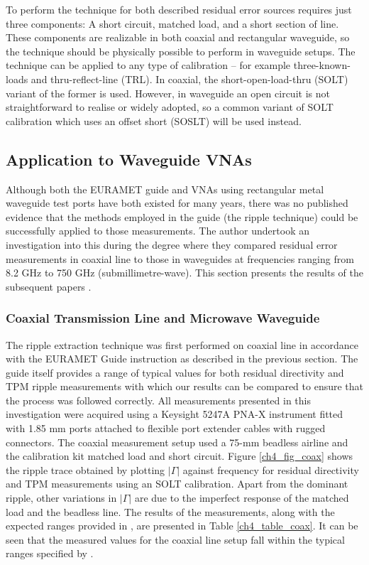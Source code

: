 \documentclass[../thesis/thesis.tex]{subfiles}
\begin{document}
To perform the technique for both described residual error sources requires just three components: A short circuit, matched load, and a short section of line. These components are realizable in both coaxial and rectangular waveguide, so the technique should be physically possible to perform in waveguide setups. The technique can be applied to any type of calibration – for example three-known-loads and thru-reflect-line (TRL). In coaxial, the short-open-load-thru (SOLT) variant of the former is used. However, in waveguide an open circuit is not straightforward to realise or widely adopted, so a common variant of SOLT calibration which uses an offset short (SOSLT) will be used instead.

\subsection{Application to Waveguide VNAs}

Although both the EURAMET guide and VNAs using rectangular metal waveguide test ports have both existed for many years, there was no published evidence that the methods employed in the guide (the ripple technique) could be successfully applied to those measurements. The author undertook an investigation into this during the degree where they compared residual error measurements in coaxial line to those in waveguides at frequencies ranging from 8.2 GHz to 750 GHz (submillimetre-wave). This section presents the results of the subsequent papers \cite{Stant_2016_Coll, Stant_2017}.

\subsubsection{Coaxial Transmission Line and Microwave Waveguide}

The ripple extraction technique was first performed on coaxial line in accordance with the EURAMET Guide \cite{EURAMET_2011} instruction as described in the previous section. The guide itself provides a range of typical values for both residual directivity and TPM ripple measurements with which our results can be compared to ensure that the process was followed correctly. All measurements presented in this investigation were acquired using a Keysight 5247A PNA-X instrument fitted with 1.85 mm ports attached to flexible port extender cables with rugged connectors. The coaxial measurement setup used a 75-mm beadless airline and the calibration kit matched load and short circuit. Figure \ref{ch4_fig_coax} shows the ripple trace obtained by plotting $|\Gamma|$ against frequency for residual directivity and TPM measurements using an SOLT calibration. Apart from the dominant ripple, other variations in $|\Gamma|$ are due to the imperfect response of the matched load and the beadless line. The results of the measurements, along with the expected ranges provided in \cite{EURAMET_2011}, are presented in Table \ref{ch4_table_coax}. It can be seen that the measured values for the coaxial line setup fall within the typical ranges specified by \cite{EURAMET_2011}.
\end{document}
